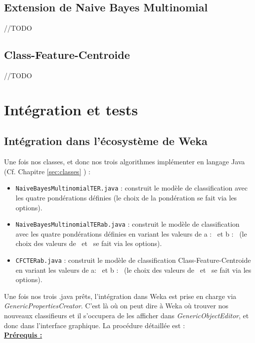 \documentclass{article}
\begin{document}
\subsection{Extension de Naive Bayes Multinomial}
//TODO
\subsection{Class-Feature-Centroide}
//TODO



\section{Intégration et tests}
\subsection{Intégration dans l'écosystème de Weka}
Une fois nos classes, et donc nos trois algorithmes implémenter en langage Java (Cf. Chapitre \ref{sec:classes} ) :
\begin{itemize}
\item  \texttt{NaiveBayesMultinomialTER.java} : construit le modèle de classification avec les quatre pondérations définies (le choix de la pondération se fait via les options).
\item  \texttt{NaiveBayesMultinomialTERab.java} : construit le modèle de classification avec les quatre pondérations définies en variant les valeurs de a : \textalpha \ et b : \textbeta \ (le choix des valeurs de \textalpha \ et \textbeta \ se fait via les options).
\item  \texttt{CFCTERab.java} : construit le modèle de classification Class-Feature-Centroide en variant les valeurs de a: \textalpha \ et b : \textbeta \ (le choix des valeurs de \textalpha \ et \textbeta \ se fait via les options).
\end{itemize}
Une fois nos trois .java prêts, l'intégration dans Weka est prise en charge via  \textit{GenericPropertiesCreator}. C'est là où on peut dire à Weka où trouver nos nouveaux classifieurs et il s'occupera de les afficher dans  \textit{GenericObjectEditor}, et donc dans l'interface graphique. La procédure détaillée est : \\
\textbf{\underline{Prérequis :}}
\end{document}
